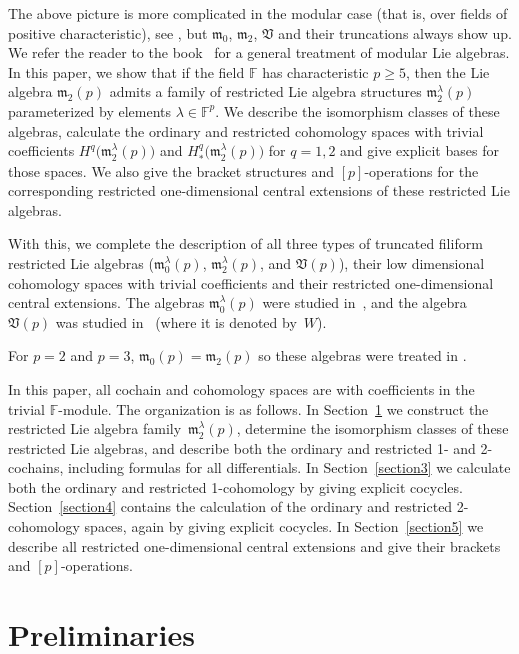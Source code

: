 \documentclass[pdftex]{sigma}
\def\m{\mathfrak m}
\def\V{\mathfrak V}
\def\F{\mathbb F}
\numberwithin{equation}{section}
\begin{document}
The above picture is more complicated in the modular case (that is,
over fields of positive characteristic), see \cite{CMN1997, CN2000, Jurman2005}, but
$\m_0$, $\m_2$, $\V$ and their truncations always show up. We refer the
reader to the book~\cite{SF} for a general treatment of modular Lie
algebras. In this paper, we show that if the field $\F$ has
characteristic $p\ge 5$, then the Lie algebra $\m_2(p)$ admits a
family of restricted Lie algebra structures $\m_2^{\lambda}(p)$
parameterized by elements $\lambda \in \F^p$. We describe the
isomorphism classes of these algebras, calculate the ordinary and restricted cohomology spaces with trivial coefficients $H^q\big(\m_2^{\lambda}(p)\big)$ and $H_*^q\big(\m_2^{\lambda}(p)\big)$ for $q=1,2$ and give explicit bases for those spaces. We also give the bracket
structures and $[p]$-operations for the corresponding restricted
one-dimensional central extensions of these restricted Lie algebras.

With this, we complete the description of all three types of truncated filiform restricted Lie algebras ($\m_0^\lambda(p)$, $\m_2^\lambda(p)$, and $\V(p)$), their low dimensional cohomology spaces with trivial coefficients and their restricted one-dimensional central extensions. The algebras $\m_0^{\lambda}(p)$ were studied in~\cite{EvFi2019}, and the algebra $\V(p)$ was studied in~\cite{EvFiPe2016} (where it is denoted by~$W$).

\begin{Remark}
 For $p=2$ and $p=3$, $\m_0(p)=\m_2(p)$ so these algebras were
 treated in \cite{EvFi2019}.
\end{Remark}

In this paper, all cochain and cohomology spaces are with coefficients in the trivial $\F$-module. The organization is as follows. In Section~\ref{section2} we construct the restricted Lie algebra family~$\m_2^{\lambda}(p)$, determine the isomorphism classes of these restricted Lie algebras, and describe both the ordinary and restricted 1- and 2-cochains, including formulas for all differentials. In Section~\ref{section3} we calculate both the ordinary and restricted 1-cohomology by giving explicit cocycles. Section~\ref{section4} contains the calculation of the ordinary and restricted 2-cohomology spaces, again by giving explicit cocycles. In Section~\ref{section5} we describe all restricted one-dimensional central extensions and give their brackets and $[p]$-operations.

\section{Preliminaries}\label{section2}
\end{document}
